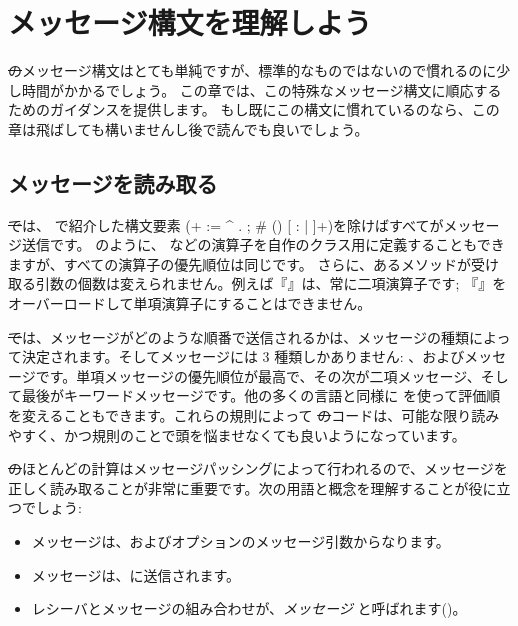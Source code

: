 \documentclass[a4paper,10pt,twoside]{book}
\begin{document}
	\renewcommand{\nnbb}[2]{} %
	\sloppy
\fi
\chapter{メッセージ構文を理解しよう}

\st のメッセージ構文はとても単純ですが、標準的なものではないので慣れるのに少し時間がかかるでしょう。
この章では、この特殊なメッセージ構文に順応するためのガイダンスを提供します。
もし既にこの構文に慣れているのなら、この章は飛ばしても構いませんし後で読んでも良いでしょう。

\section{メッセージを読み取る}

\st では、 で紹介した構文要素 (\ct + := ^ . ; # () {} [ : | ]+)を除けばすべてがメッセージ送信です。
 のように、\ct{+} などの演算子を自作のクラス用に定義することもできますが、すべての演算子の優先順位は同じです。
さらに、あるメソッドが受け取る引数の個数は変えられません。例えば『\ct{-}』は、常に二項演算子です; 『\ct{-}』をオーバーロードして単項演算子にすることはできません。

\st では、メッセージがどのような順番で送信されるかは、メッセージの種類によって決定されます。そしてメッセージには 3 種類しかありません: 、およびメッセージです。単項メッセージの優先順位が最高で、その次が二項メッセージ、そして最後がキーワードメッセージです。他の多くの言語と同様に を使って評価順を変えることもできます。これらの規則によって \st のコードは、可能な限り読みやすく、かつ規則のことで頭を悩ませなくても良いようになっています。

\st のほとんどの計算はメッセージパッシングによって行われるので、メッセージを正しく読み取ることが非常に重要です。次の用語と概念を理解することが役に立つでしょう:

\begin{itemize}
  \item メッセージは、およびオプションのメッセージ引数からなります。
  \item メッセージは、に送信されます。
  \item レシーバとメッセージの組み合わせが、\emph{メッセージ} と呼ばれます()。
\end{itemize}
\end{document}
